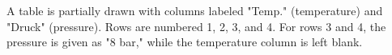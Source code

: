 A table is partially drawn with columns labeled "Temp." (temperature) and "Druck" (pressure). Rows are numbered 1, 2, 3, and 4. For rows 3 and 4, the pressure is given as "8 bar," while the temperature column is left blank.